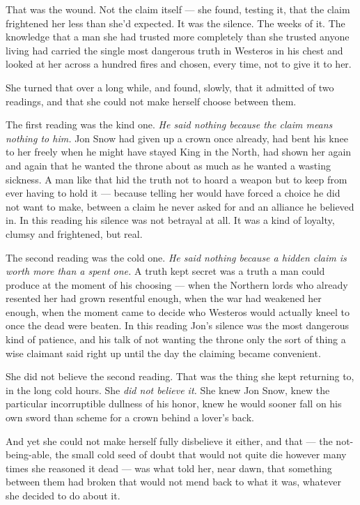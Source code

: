 That was the wound. Not the claim itself — she found, testing it, that the claim frightened her less than she’d expected. It was the silence. The weeks of it. The knowledge that a man she had trusted more completely than she trusted anyone living had carried the single most dangerous truth in Westeros in his chest and looked at her across a hundred fires and chosen, every time, not to give it to her.

She turned that over a long while, and found, slowly, that it admitted of two readings, and that she could not make herself choose between them.

The first reading was the kind one. \textit{He said nothing because the claim means nothing to him.} Jon Snow had given up a crown once already, had bent his knee to her freely when he might have stayed King in the North, had shown her again and again that he wanted the throne about as much as he wanted a wasting sickness. A man like that hid the truth not to hoard a weapon but to keep from ever having to hold it — because telling her would have forced a choice he did not want to make, between a claim he never asked for and an alliance he believed in. In this reading his silence was not betrayal at all. It was a kind of loyalty, clumsy and frightened, but real.

The second reading was the cold one. \textit{He said nothing because a hidden claim is worth more than a spent one.} A truth kept secret was a truth a man could produce at the moment of his choosing — when the Northern lords who already resented her had grown resentful enough, when the war had weakened her enough, when the moment came to decide who Westeros would actually kneel to once the dead were beaten. In this reading Jon’s silence was the most dangerous kind of patience, and his talk of not wanting the throne only the sort of thing a wise claimant said right up until the day the claiming became convenient.

She did not believe the second reading. That was the thing she kept returning to, in the long cold hours. She \textit{did not believe it.} She knew Jon Snow, knew the particular incorruptible dullness of his honor, knew he would sooner fall on his own sword than scheme for a crown behind a lover’s back.

And yet she could not make herself fully disbelieve it either, and that — the not-being-able, the small cold seed of doubt that would not quite die however many times she reasoned it dead — was what told her, near dawn, that something between them had broken that would not mend back to what it was, whatever she decided to do about it.

